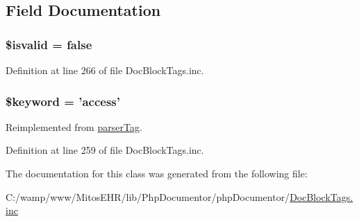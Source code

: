 \subsection{\-Field \-Documentation}
\hypertarget{classparser_access_tag_a836830dd749f0dce60c36cd6bcf5a580}{
\subsubsection[{\$isvalid}]{\setlength{\rightskip}{0pt plus 5cm}\$isvalid = false}}\label{classparser_access_tag_a836830dd749f0dce60c36cd6bcf5a580}


\-Definition at line 266 of file \-Doc\-Block\-Tags.\-inc.

\hypertarget{classparser_access_tag_a4a925d6b38bcf3957c713a7d3dc7da1f}{
\subsubsection[{\$keyword}]{\setlength{\rightskip}{0pt plus 5cm}\$keyword = 'access'}}\label{classparser_access_tag_a4a925d6b38bcf3957c713a7d3dc7da1f}


\-Reimplemented from \hyperlink{classparser_tag_a4a925d6b38bcf3957c713a7d3dc7da1f}{parser\-Tag}.



\-Definition at line 259 of file \-Doc\-Block\-Tags.\-inc.



\-The documentation for this class was generated from the following file\-:\begin{DoxyCompactItemize}
\item 
\-C\-:/wamp/www/\-Mitos\-E\-H\-R/lib/\-Php\-Documentor/php\-Documentor/\hyperlink{_doc_block_tags_8inc}{\-Doc\-Block\-Tags.\-inc}\end{DoxyCompactItemize}
